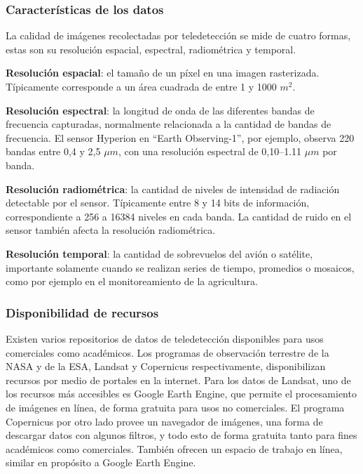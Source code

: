 \subsubsection{Características de los datos}

La calidad de imágenes recolectadas por teledetección se mide de cuatro formas, estas son su resolución espacial,
espectral, radiométrica y temporal.

{\bf Resolución espacial}: el tamaño de un píxel en una imagen rasterizada. Típicamente corresponde a un área cuadrada
de entre 1 y 1000 $m^2$.

{\bf Resolución espectral}: la longitud de onda de las diferentes bandas de frecuencia capturadas, normalmente
relacionada a la cantidad de bandas de frecuencia. El sensor Hyperion en \enquote{Earth Observing-1}, por ejemplo, observa 220
bandas entre 0,4 y 2,5 $\mu m$, con una resolución espectral de 0,10--1.11 $\mu m$ por banda.
\autocite{earth-observatory-earth-observing-1}

{\bf Resolución radiométrica}: la cantidad de niveles de intensidad de radiación detectable por el sensor. Típicamente
entre 8 y 14 bits de información, correspondiente a 256 a 16384 niveles en cada banda. La cantidad de ruido en el
sensor también afecta la resolución radiométrica.

{\bf Resolución temporal}: la cantidad de sobrevuelos del avión o satélite, importante solamente cuando se realizan
series de tiempo, promedios o mosaicos, como por ejemplo en el monitoreamiento de la agricultura.

\subsubsection{Disponibilidad de recursos}

Existen varios repositorios de datos de teledetección disponibles para usos comerciales como académicos. Los programas
de observación terrestre de la NASA y de la ESA, Landsat y Copernicus respectivamente, disponibilizan recursos por
medio de portales en la internet. Para los datos de Landsat, uno de los recursos más accesibles es Google Earth Engine,
que permite el procesamiento de imágenes en línea, de forma gratuita para usos no comerciales.
\autocite{landsat-data-access} El programa Copernicus por otro lado provee un navegador de imágenes, una forma de
descargar datos con algunos filtros, y todo esto de forma gratuita tanto para fines académicos como comerciales.
\autocite{copernicus-licences} También ofrecen un espacio de trabajo en línea, similar en propósito a Google Earth
Engine. \autocite{copernicus-ds-about}
